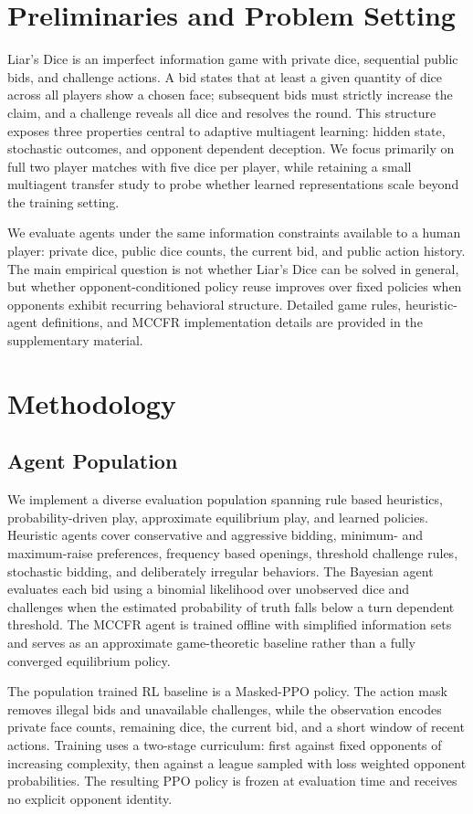 \documentclass{article}
\begin{document}
\section{Preliminaries and Problem Setting}
Liar's Dice is an imperfect information game with private dice, sequential public bids, and challenge actions. A bid states that at least a given quantity of dice across all players show a chosen face; subsequent bids must strictly increase the claim, and a challenge reveals all dice and resolves the round. This structure exposes three properties central to adaptive multiagent learning: hidden state, stochastic outcomes, and opponent dependent deception. We focus primarily on full two player matches with five dice per player, while retaining a small multiagent transfer study to probe whether learned representations scale beyond the training setting.

We evaluate agents under the same information constraints available to a human player: private dice, public dice counts, the current bid, and public action history. The main empirical question is not whether Liar's Dice can be solved in general, but whether opponent-conditioned policy reuse improves over fixed policies when opponents exhibit recurring behavioral structure. Detailed game rules, heuristic-agent definitions, and MCCFR implementation details are provided in the supplementary material.


\section{Methodology}
\subsection{Agent Population}
We implement a diverse evaluation population spanning rule based heuristics, probability-driven play, approximate equilibrium play, and learned policies. Heuristic agents cover conservative and aggressive bidding, minimum- and maximum-raise preferences, frequency based openings, threshold challenge rules, stochastic bidding, and deliberately irregular behaviors. The Bayesian agent evaluates each bid using a binomial likelihood over unobserved dice and challenges when the estimated probability of truth falls below a turn dependent threshold. The MCCFR agent is trained offline with simplified information sets and serves as an approximate game-theoretic baseline rather than a fully converged equilibrium policy.

The population trained RL baseline is a Masked-PPO policy. The action mask removes illegal bids and unavailable challenges, while the observation encodes private face counts, remaining dice, the current bid, and a short window of recent actions. Training uses a two-stage curriculum: first against fixed opponents of increasing complexity, then against a league sampled with loss weighted opponent probabilities. The resulting PPO policy is frozen at evaluation time and receives no explicit opponent identity.
\end{document}
